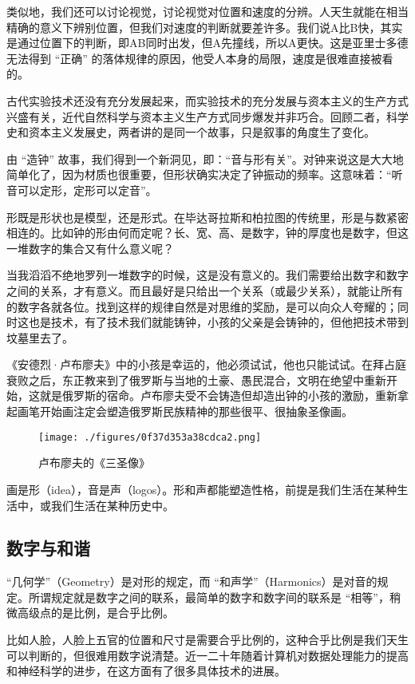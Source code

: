 类似地，我们还可以讨论视觉，讨论视觉对位置和速度的分辨。人天生就能在相当精确的意义下辨别位置，但我们对速度的判断就要差许多。我们说A比B快，其实是通过位置下的判断，即AB同时出发，但A先撞线，所以A更快。这是亚里士多德无法得到 “正确” 的落体规律的原因，他受人本身的局限，速度是很难直接被看的。

古代实验技术还没有充分发展起来，而实验技术的充分发展与资本主义的生产方式兴盛有关，近代自然科学与资本主义生产方式同步爆发并非巧合。回顾二者，科学史和资本主义发展史，两者讲的是同一个故事，只是叙事的角度生了变化。

由 “造钟” 故事，我们得到一个新洞见，即：“音与形有关”。对钟来说这是大大地简单化了，因为材质也很重要，但形状确实决定了钟振动的频率。这意味着：“听音可以定形，定形可以定音”。

形既是形状也是模型，还是形式。在毕达哥拉斯和柏拉图的传统里，形是与数紧密相连的。比如钟的形由何而定呢？长、宽、高、是数字，钟的厚度也是数字，但这一堆数字的集合又有什么意义呢？

当我滔滔不绝地罗列一堆数字的时候，这是没有意义的。我们需要给出数字和数字之间的关系，才有意义。而且最好是只给出一个关系（或最少关系），就能让所有的数字各就各位。找到这样的规律自然是对思维的奖励，是可以向众人夸耀的；同时这也是技术，有了技术我们就能铸钟，小孩的父亲是会铸钟的，但他把技术带到坟墓里去了。

《安德烈·卢布廖夫》中的小孩是幸运的，他必须试试，他也只能试试。在拜占庭衰败之后，东正教来到了俄罗斯与当地的土豪、愚民混合，文明在绝望中重新开始，这就是俄罗斯的宿命。卢布廖夫受不会铸造但却造出钟的小孩的激励，重新拿起画笔开始画注定会塑造俄罗斯民族精神的那些很平、很抽象圣像画。

\begin{figure}[ht]
\centering
\texttt{[image: ./figures/0f37d353a38cdca2.png]}
\caption{卢布廖夫的《三圣像》} \label{fig_ClBohr_2}
\end{figure}

画是形（idea），音是声（logos）。形和声都能塑造性格，前提是我们生活在某种生活中，或我们生活在某种历史中。

\subsection{数字与和谐}

“几何学”（Geometry）是对形的规定，而 “和声学”（Harmonics）是对音的规定。所谓规定就是数字之间的联系，最简单的数字和数字间的联系是 “相等”，稍微高级点的是比例，是合乎比例。

比如人脸，人脸上五官的位置和尺寸是需要合乎比例的，这种合乎比例是我们天生可以判断的，但很难用数字说清楚。近一二十年随着计算机对数据处理能力的提高和神经科学的进步，在这方面有了很多具体技术的进展。

